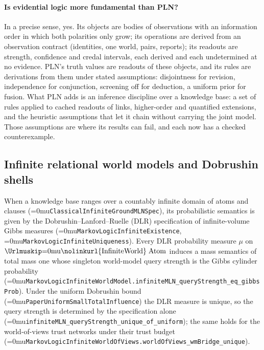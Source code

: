 \documentclass[11pt]{article}
\newcommand{\leanname}[1]{\textup{\Urlmuskip=0mu\relax\nolinkurl{#1}}}
\theoremstyle{definition}
\theoremstyle{remark}
\begin{document}
\paragraph{Is evidential logic more fundamental than PLN?}
In a precise sense, yes.  Its objects are bodies of observations with an
information order in which both polarities only grow; its operations are
derived from an observation contract (identities, one world, pairs, reports);
its readouts are strength, confidence and credal intervals, each derived and
each undetermined at no evidence.  PLN's truth values are readouts of these
objects, and its rules are derivations from them under stated assumptions:
disjointness for revision, independence for conjunction, screening off for
deduction, a uniform prior for fusion.  What PLN adds is an inference
discipline over a knowledge base: a set of rules applied to cached readouts
of links, higher-order and quantified extensions, and the heuristic
assumptions that let it chain without carrying the joint model.  Those
assumptions are where its results can fail, and each now has a checked
counterexample.

\subsection{Infinite relational world models and Dobrushin shells}
\label{sec:infinite-mln-wm-bubbles}

When a knowledge base ranges over a countably infinite domain of atoms and
clauses (\leanname{ClassicalInfiniteGroundMLNSpec}), its probabilistic semantics
is given by the Dobrushin--Lanford--Ruelle (DLR) specification of
infinite-volume Gibbs measures (\leanname{MarkovLogicInfiniteExistence},
\leanname{MarkovLogicInfiniteUniqueness}).  Every DLR probability measure $\mu$
on $\leanname{InfiniteWorld}\;\mathrm{Atom}$ induces a mass semantics of total
mass one whose singleton world-model query strength is the Gibbs cylinder
probability
(\leanname{MarkovLogicInfiniteWorldModel.infiniteMLN_queryStrength_eq_gibbsProb}).
Under the uniform Dobrushin bound (\leanname{PaperUniformSmallTotalInfluence})
the DLR measure is unique, so the query strength is determined by the
specification alone (\leanname{infiniteMLN_queryStrength_unique_of_uniform});
the same holds for the world-of-views trust networks under their trust budget
(\leanname{MarkovLogicInfiniteWorldOfViews.worldOfViews_wmBridge_unique}).
\end{document}
